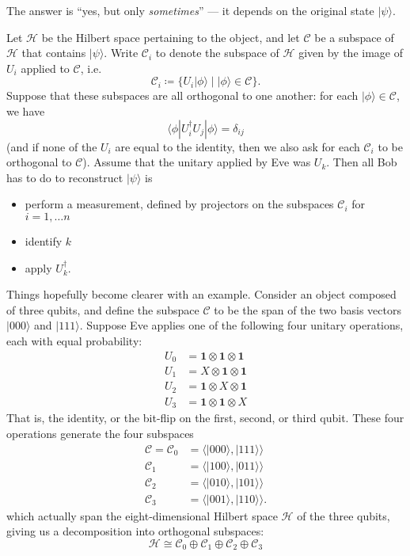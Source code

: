 \documentclass[fleqn]{article}
\providecommand{\tightlist}{%
  \setlength{\itemsep}{0pt}\setlength{\parskip}{0pt}}
\begin{document}
The answer is ``yes, but only \emph{sometimes}'' --- it depends on the original state \(|\psi\rangle\).

Let \(\mathcal{H}\) be the Hilbert space pertaining to the object, and let \(\mathcal{C}\) be a subspace of \(\mathcal{H}\) that contains \(|\psi\rangle\).
Write \(\mathcal{C}_i\) to denote the subspace of \(\mathcal{H}\) given by the image of \(U_i\) applied to \(\mathcal{C}\), i.e.
\[
  \mathcal{C}_i \coloneqq \{U_i|\phi\rangle \mid |\phi\rangle\in\mathcal{C}\}.
\]
Suppose that these subspaces are all orthogonal to one another: for each \(|\phi\rangle\in\mathcal{C}\), we have
\[
  \langle\phi|U^\dagger_i U_j|\phi\rangle = \delta_{ij}
\]
(and if none of the \(U_i\) are equal to the identity, then we also ask for each \(\mathcal{C}_i\) to be orthogonal to \(\mathcal{C}\)).
Assume that the unitary applied by Eve was \(U_k\).
Then all Bob has to do to reconstruct \(|\psi\rangle\) is

\begin{itemize}
\tightlist
\item
  perform a measurement, defined by projectors on the subspaces \(\mathcal{C}_i\) for \(i=1,\ldots n\)
\item
  identify \(k\)
\item
  apply \(U_k^\dagger\).
\end{itemize}

Things hopefully become clearer with an example.
Consider an object composed of three qubits, and define the subspace \(\mathcal{C}\) to be the span of the two basis vectors \(|000\rangle\) and \(|111\rangle\).
Suppose Eve applies one of the following four unitary operations, each with equal probability:
\[
  \begin{aligned}
    U_0 &= \mathbf{1}\otimes\mathbf{1}\otimes \mathbf{1}
  \\U_1 &= X\otimes\mathbf{1}\otimes \mathbf{1}
  \\U_2 &= \mathbf{1}\otimes X\otimes \mathbf{1}
  \\U_3 &= \mathbf{1}\otimes\mathbf{1}\otimes X
  \end{aligned}
\]
That is, the identity, or the bit-flip on the first, second, or third qubit.
These four operations generate the four subspaces
\[
  \begin{aligned}
    \mathcal{C} = \mathcal{C}_0 &= \Big\langle|000\rangle,|111\rangle\Big\rangle
  \\\mathcal{C}_1 &= \Big\langle|100\rangle,|011\rangle\Big\rangle
  \\\mathcal{C}_2 &= \Big\langle|010\rangle,|101\rangle\Big\rangle
  \\\mathcal{C}_3 &= \Big\langle|001\rangle,|110\rangle\Big\rangle.
  \end{aligned}
\]
which actually span the eight-dimensional Hilbert space \(\mathcal{H}\) of the three qubits, giving us a decomposition into orthogonal subspaces:
\[
  \mathcal{H}
  \cong \mathcal{C}_0 \oplus \mathcal{C}_1 \oplus\mathcal{C}_2 \oplus \mathcal{C}_3
\]
\end{document}
